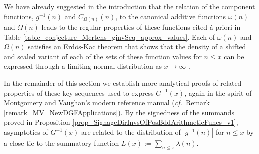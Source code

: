 \documentclass[11pt,reqno,a4letter]{article}
\numberwithin{figure}{section}
\numberwithin{table}{section}
\newcommand{\cf}{\textit{cf.\ }}
\theoremstyle{plain}
\numberwithin{theorem}{section}
\theoremstyle{definition}
\begin{document}
We have already suggested in the introduction that the relation of the component 
functions, $g^{-1}(n)$ and $C_{\Omega(n)}(n)$, to the canonical additive functions 
$\omega(n)$ and $\Omega(n)$ leads to the regular properties of these functions 
cited \'{a} priori in Table \ref{table_conjecture_Mertens_ginvSeq_approx_values}. 
Each of $\omega(n)$ and $\Omega(n)$ satisfies 
an Erd\"os-Kac theorem that shows that the density of a shifted and scaled variant of each 
of the sets of these function values for $n \leq x$ can be expressed through a 
limiting normal distribution as $x \rightarrow \infty$ 
\cite{ERDOS-KAC-REF,BILLINGSLY-CLT-PRIMEDIVFUNC,RENYI-TURAN}. 

In the remainder of this section we establish more analytical proofs of 
related properties of these key sequences used to express $G^{-1}(x)$, 
again in the spirit of Montgomery and Vaughan's modern reference manual 
(\cf Remark \ref{remark_MV_NewDGFApplications}). 
By the signedness of the summands proved in 
Proposition \ref{prop_SignageDirInvsOfPosBddArithmeticFuncs_v1}, 
asymptotics of $G^{-1}(x)$ are related to the distribution of 
$|g^{-1}(n)|$ for $n \leq x$ by a close tie to the 
summatory function $L(x) := \sum_{n \leq x} \lambda(n)$. 
\end{document}
